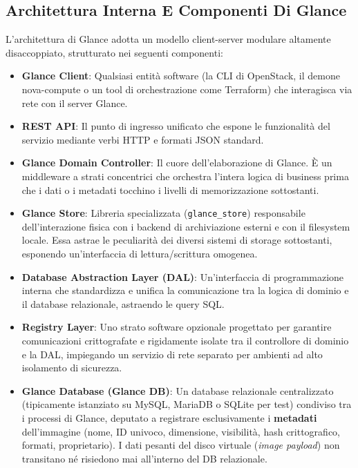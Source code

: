 \documentclass[11pt, a4paper]{article}
\begin{document}

\subsection{Architettura Interna E Componenti Di Glance}

L'architettura di Glance adotta un modello client-server modulare altamente disaccoppiato, strutturato nei seguenti componenti:
\begin{itemize}
    \item \textbf{Glance Client}: Qualsiasi entità software (la CLI di OpenStack, il demone nova-compute o un tool di orchestrazione come Terraform) che interagisca via rete con il server Glance.
    \item \textbf{REST API}: Il punto di ingresso unificato che espone le funzionalità del servizio mediante verbi HTTP e formati JSON standard.
    \item \textbf{Glance Domain Controller}: Il cuore dell'elaborazione di Glance. È un middleware a strati concentrici che orchestra l'intera logica di business prima che i dati o i metadati tocchino i livelli di memorizzazione sottostanti.
    \item \textbf{Glance Store}: Libreria specializzata (\texttt{glance\_store}) responsabile dell'interazione fisica con i backend di archiviazione esterni e con il filesystem locale. Essa astrae le peculiarità dei diversi sistemi di storage sottostanti, esponendo un'interfaccia di lettura/scrittura omogenea.
    \item \textbf{Database Abstraction Layer (DAL)}: Un'interfaccia di programmazione interna che standardizza e unifica la comunicazione tra la logica di dominio e il database relazionale, astraendo le query SQL.
    \item \textbf{Registry Layer}: Uno strato software opzionale progettato per garantire comunicazioni crittografate e rigidamente isolate tra il controllore di dominio e la DAL, impiegando un servizio di rete separato per ambienti ad alto isolamento di sicurezza.
    \item \textbf{Glance Database (Glance DB)}: Un database relazionale centralizzato (tipicamente istanziato su MySQL, MariaDB o SQLite per test) condiviso tra i processi di Glance, deputato a registrare esclusivamente i \textbf{metadati} dell'immagine (nome, ID univoco, dimensione, visibilità, hash crittografico, formati, proprietario). I dati pesanti del disco virtuale (\emph{image payload}) non transitano né risiedono mai all'interno del DB relazionale.
\end{itemize}
\end{document}
